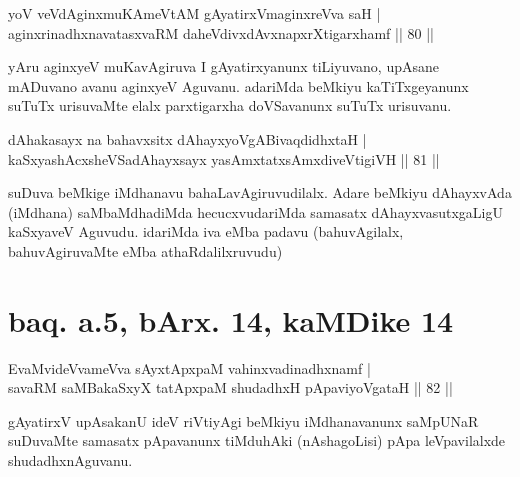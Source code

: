 
\begin{shl}
yoV veVdAginxmuKAmeVtAM gAyatirxVmaginxreVva saH | \\
aginxrinadhxnavatasxvaRM daheVdivxdAvxnapxrXtigarxhamf \hfill||  80 || 
\end{shl}

\begin{artha} 
yAru aginxyeV muKavAgiruva I gAyatirxyanunx tiLiyuvano, upAsane 
mADuvano avanu aginxyeV Aguvanu. adariMda beMkiyu kaTiTxgeyanunx 
suTuTx urisuvaMte elalx parxtigarxha doVSavanunx suTuTx urisuvanu.
\end{artha}


\begin{shl}
dAhakasayx na bahavxsitx dAhayxyoVgABivaqdidhxtaH | \\
kaSxyashAcxsheVSadAhayxsayx yasAmxtatxsAmxdiveVtigiVH \hfill||  81 || 
\end{shl}

\begin{artha} 
suDuva beMkige iMdhanavu bahaLavAgiruvudilalx. Adare beMkiyu 
dAhayxvAda (iMdhana) saMbaMdhadiMda hecucxvudariMda samasatx 
dAhayxvasutxgaLigU kaSxyaveV Aguvudu. idariMda iva eMba padavu 
(bahuvAgilalx, bahuvAgiruvaMte eMba athaRdalilxruvudu)
\end{artha}

\section*{baq. a.5, bArx. 14, kaMDike 14}

\begin{shl}
EvaMvideVvameVva sAyxtApxpaM vahinxvadinadhxnamf | \\
savaRM saMBakaSxyX tatApxpaM shudadhxH pApaviyoVgataH \hfill||  82 ||
\end{shl}

\begin{artha} 
gAyatirxV upAsakanU ideV riVtiyAgi beMkiyu iMdhanavanunx saMpUNaR 
suDuvaMte samasatx pApavanunx tiMduhAki (nAshagoLisi) pApa 
leVpavilalxde shudadhxnAguvanu.
\end{artha}



